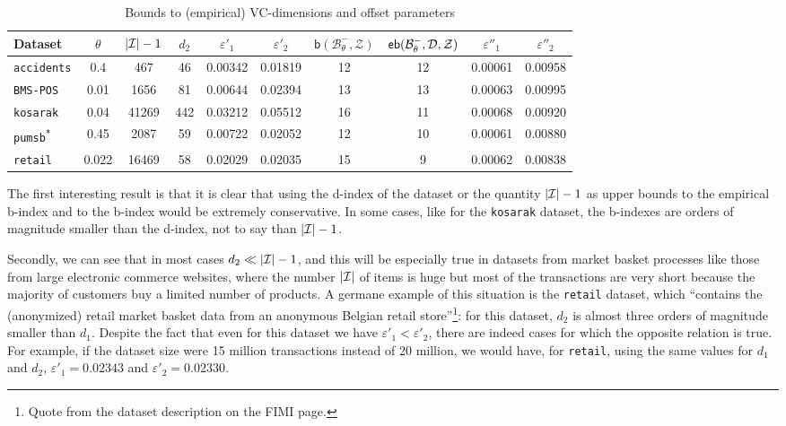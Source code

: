 \begin{table*}[tb]
  \centering
\begin{tabular}{lccccccccc}
\toprule
Dataset & $\theta$ & $|{\cal I}|-1$  & $d_2$ & $\varepsilon'_1$ & $\varepsilon'_2$ &
$\mathsf{b}(\mathcal{B}^-_\theta,\mathcal{Z})$ & $\mathsf{eb}(\mathcal{B}^-_\theta,{\cal D},\mathcal{Z})$ & $\varepsilon''_1$ & $\varepsilon''_2$ \\
\midrule
\texttt{accidents} & 0.4 & 467 & 46 & 0.00342 & 0.01819 & 12 & 12 & 0.00061 & 0.00958 \\
\texttt{BMS-POS} & 0.01 & 1656 & 81 & 0.00644 & 0.02394 & 13 & 13 & 0.00063 & 0.00995 \\
\texttt{kosarak} & 0.04 & 41269 & 442 & 0.03212 & 0.05512 & 16 & 11 & 0.00068 & 0.00920 \\
\texttt{pumsb\textsuperscript{*}} & 0.45 & 2087 & 59 & 0.00722 & 0.02052 & 12 & 10 & 0.00061 & 0.00880\\
\texttt{retail} & 0.022 & 16469 & 58 & 0.02029 & 0.02035 & 15 & 9 & 0.00062 & 0.00838 \\
\bottomrule
\end{tabular}
\caption{Bounds to (empirical) VC-dimensions and offset parameters}
\label{table:vcindex}
\end{table*}

The first interesting result is that it is clear that using the d-index of the
dataset or the quantity $|{\cal I}|-1$ as upper bounds to the empirical b-index and
to the b-index would be extremely conservative. In some cases, like for the
\texttt{kosarak} dataset, the b-indexes are orders of magnitude smaller than the
d-index, not to say than $|{\cal I}|-1$.

Secondly, we can see that in most cases $d_2\ll |{\cal I}|-1$, and this will be especially true in datasets
from market basket processes like those from large electronic commerce websites,
where the number $|{\cal I}|$ of items is huge but most of the transactions are very
short because the majority of customers buy a limited number of products.
A germane example of this situation is the \texttt{retail} dataset, which
``contains the (anonymized) retail market basket data from an anonymous Belgian
retail store''\footnote{Quote from the dataset description on the FIMI page.}:
for this dataset, $d_2$ is almost three orders of magnitude smaller than
$d_1$. Despite the fact that even for this dataset we have
$\varepsilon'_1<\varepsilon'_2$, there are indeed cases for which the opposite
relation is true. For example, if the dataset size were 15 million transactions
instead of 20 million, we would have, for \texttt{retail}, using the same values
for $d_1$ and $d_2$, $\varepsilon'_1=0.02343$ and $\varepsilon'_2=0.02330$.
\iffalse
{\bf FV:} Is it always the case that with fewer transactions we have $\varepsilon'_2 <
\varepsilon'_1$? If so, we should comment on this.
{\bf MR:} If $d_2\ll d_1$ and there are fewer transactions, then it is more
likely that $\varepsilon'_2<\varepsilon'_1$.
\fi

